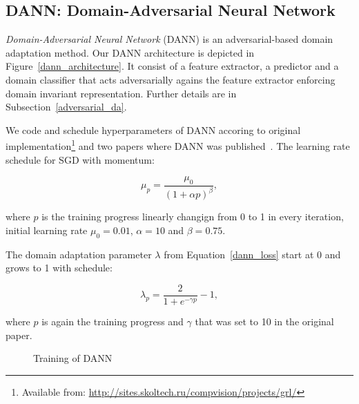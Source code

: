 \subsection{DANN: Domain-Adversarial Neural Network}

\textit{Domain-Adversarial Neural Network} (DANN) is an adversarial-based domain adaptation method.
Our DANN architecture is depicted in Figure~\ref{dann_architecture}.
It consist of a feature extractor, a predictor and a domain classifier
that acts adversarially agains the feature extractor
enforcing domain invariant representation.
Further details are in Subsection~\ref{adversarial_da}.

We code and schedule hyperparameters of DANN accoring to original
implementation\footnote{Available from: \url{http://sites.skoltech.ru/compvision/projects/grl/}}
and two papers where DANN was published~\cite{ganin2015, ganin2016}.
The learning rate schedule for SGD with momentum:

\begin{equation}
	\mu_p = \frac{\mu_0}{(1 + \alpha p)^\beta},
\end{equation}

where \(p\) is the training progress linearly changign from 0 to 1 in every iteration,
initial learning rate \(\mu_0 = 0.01\), \(\alpha = 10\) and \(\beta = 0.75\).

The domain adaptation parameter \(\lambda\) from Equation~\ref{dann_loss}
start at 0 and grows to 1 with schedule:

\begin{equation}
	\lambda_p = \frac{2}{1 + e^{-\gamma p}} - 1,
\end{equation}

where \(p\) is again the training progress
and \(\gamma\) that was set to 10 in the original paper.

\begin{figure}
	\caption{Training of DANN}
	\label{dann_training}
\end{figure}

